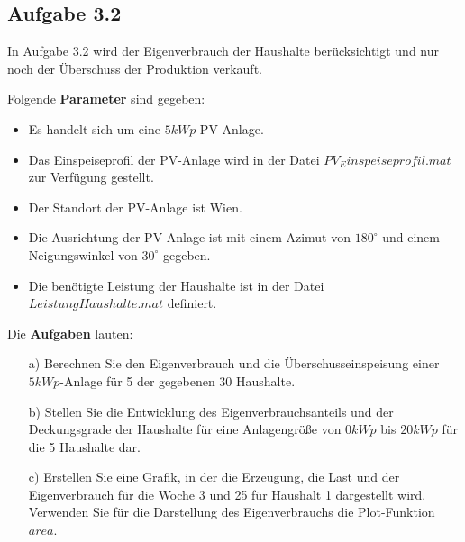 \documentclass[a4paper,12pt]{article}
\begin{document}
	\subsection{Aufgabe 3.2}
	\label{sec:Aufgabenstellung32}
	In Aufgabe 3.2 wird der Eigenverbrauch der Haushalte berücksichtigt und nur noch der Überschuss der Produktion verkauft.\\ \par
	\noindent Folgende \textbf{Parameter} sind gegeben:
	\begin{itemize}
		\item Es handelt sich um eine $5kWp$ PV-Anlage.
		\item Das Einspeiseprofil der PV-Anlage wird in der Datei $PV_Einspeiseprofil.mat$ zur Verfügung gestellt.
		\item Der Standort der PV-Anlage ist Wien.
		\item Die Ausrichtung der PV-Anlage ist mit einem Azimut von $180^{\circ}$ und einem Neigungswinkel von $30^{\circ}$ gegeben.
		\item Die benötigte Leistung der Haushalte ist in der Datei $LeistungHaushalte.mat$ definiert.
	\end{itemize}
	Die \textbf{Aufgaben} lauten:
	\begin{itemize}
		\item[a)] Berechnen Sie den Eigenverbrauch und die Überschusseinspeisung einer $5kWp$-Anlage für 5 der gegebenen 30 Haushalte.
		\item[b)] Stellen Sie die Entwicklung des Eigenverbrauchsanteils und der Deckungsgrade der Haushalte für eine Anlagengröße von $0kWp$ bis $20kWp$ für die 5 Haushalte dar.
		\item[c)] Erstellen Sie eine Grafik, in der die Erzeugung, die Last und der Eigenverbrauch für die Woche 3 und 25 für Haushalt 1 dargestellt wird. Verwenden Sie für die Darstellung des Eigenverbrauchs die Plot-Funktion $area$.
	\end{itemize}
\end{document}
